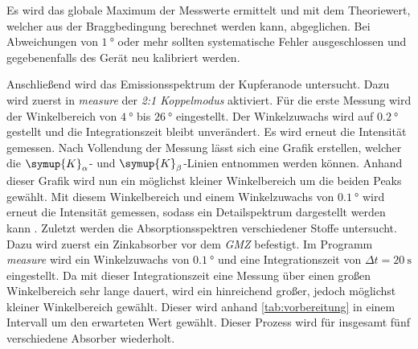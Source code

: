 Es wird das globale Maximum der Messwerte ermittelt und mit dem Theoriewert, welcher aus der Braggbedingung berechnet werden kann, abgeglichen.
Bei Abweichungen von $\qty{1}{\degree}$ oder mehr sollten systematische Fehler ausgeschlossen und gegebenenfalls des Gerät neu kalibriert werden.

Anschließend wird das Emissionsspektrum der Kupferanode untersucht. Dazu wird zuerst in \textit{measure} der \textit{2:1 Koppelmodus} aktiviert. Für die erste Messung 
wird der Winkelbereich von $\qty{4}{\degree}$ bis $\qty{26}{\degree}$ eingestellt. Der Winkelzuwachs wird auf $\qty{0.2}{\degree}$ gestellt und die Integrationszeit bleibt 
unverändert. Es wird erneut die Intensität gemessen. Nach Vollendung der Messung lässt sich eine Grafik erstellen, welcher die $\symup{K}_\alpha$- und $\symup{K}_\beta$-Linien 
entnommen werden können. Anhand dieser Grafik wird nun ein möglichst kleiner Winkelbereich um die beiden Peaks gewählt. Mit diesem Winkelbereich und einem Winkelzuwachs von
$\qty{0.1}{\degree}$ wird erneut die Intensität gemessen, sodass ein Detailspektrum dargestellt werden kann
. 
Zuletzt werden die Absorptionsspektren verschiedener Stoffe untersucht. Dazu wird zuerst ein Zinkabsorber vor dem \textit{GMZ} befestigt.
Im Programm \textit{measure} wird ein Winkelzuwachs
von $\qty{0.1}{\degree}$ und eine Integrationszeit von $\Delta t = \qty{20}{\second}$ eingestellt. Da mit dieser Integrationszeit eine Messung über einen großen 
Winkelbereich sehr lange dauert, wird ein hinreichend großer, jedoch möglichst kleiner Winkelbereich gewählt. Dieser wird anhand \autoref{tab:vorbereitung} in einem Intervall
um den erwarteten Wert gewählt. Dieser Prozess wird für insgesamt fünf verschiedene Absorber wiederholt.
